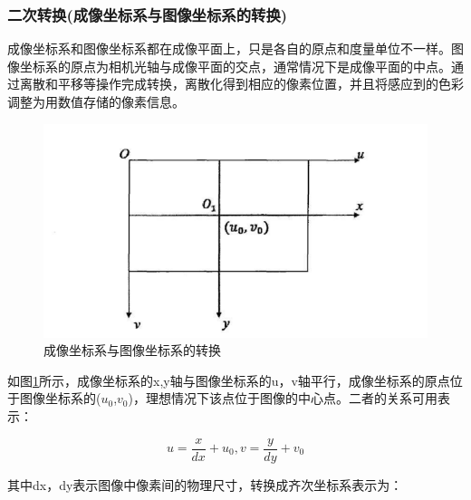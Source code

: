 \subsubsection{二次转换(成像坐标系与图像坐标系的转换)}

成像坐标系和图像坐标系都在成像平面上，只是各自的原点和度量单位不一样。图像坐标系的原点为相机光轴与成像平面的交点，通常情况下是成像平面的中点。通过离散和平移等操作完成转换，离散化得到相应的像素位置，并且将感应到的色彩调整为用数值存储的像素信息。

\begin{figure}[h]
	\includegraphics{pic/para_3.png}
	\caption{成像坐标系与图像坐标系的转换}
	\label{para_3}
\end{figure}

如图\ref{para_3}所示，成像坐标系的x,y轴与图像坐标系的u，v轴平行，成像坐标系的原点位于图像坐标系的(${u_0}$,${v_0}$)，理想情况下该点位于图像的中心点。二者的关系可用表示：

\begin{equation}
u = \frac{x}{{dx}} + {u_0},v = \frac{y}{{dy}} + {v_0}
\end{equation}

其中dx，dy表示图像中像素间的物理尺寸，转换成齐次坐标系表示为：


